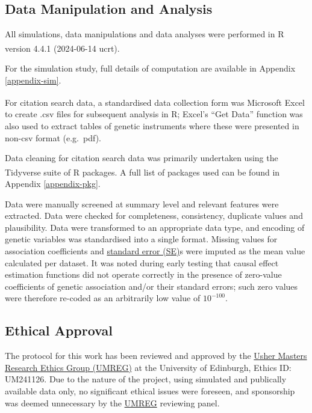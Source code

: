 \documentclass[
]{article}
\begin{document}
\subsection{Data Manipulation and Analysis}\label{data-manipulation-and-analysis}

All simulations, data manipulations and data analyses were performed in R version 4.4.1 (2024-06-14 ucrt)\textsuperscript{}.

For the simulation study, full details of computation are available in Appendix \ref{appendix-sim}.

For citation search data, a standardised data collection form was Microsoft Excel\textsuperscript{} to create .csv files for subsequent analysis in R; Excel's ``Get Data'' function was also used to extract tables of genetic instruments where these were presented in non-csv format (e.g.~pdf).

Data cleaning for citation search data was primarily undertaken using the Tidyverse suite of R packages\textsuperscript{}. A full list of packages used can be found in Appendix \ref{appendix-pkg}.

Data were manually screened at summary level and relevant features were extracted. Data were checked for completeness, consistency, duplicate values and plausibility. Data were transformed to an appropriate data type, and encoding of genetic variables was standardised into a single format. Missing values for association coefficients and \hyperref[acronyms_SE]{standard error (SE)}s were imputed as the mean value calculated per dataset. It was noted during early testing that causal effect estimation functions did not operate correctly in the presence of zero-value coefficients of genetic association and/or their standard errors; such zero values were therefore re-coded as an arbitrarily low value of \(10^{-100}\).

\subsection{Ethical Approval}\label{ethical-approval}

The protocol for this work has been reviewed and approved by the \hyperref[acronyms_UMREG]{Usher Masters Research Ethics Group (UMREG)} at the University of Edinburgh, Ethics ID: UM241126. Due to the nature of the project, using simulated and publically available data only, no significant ethical issues were foreseen, and sponsorship was deemed unnecessary by the \hyperref[acronyms_UMREG]{UMREG} reviewing panel.
\end{document}
